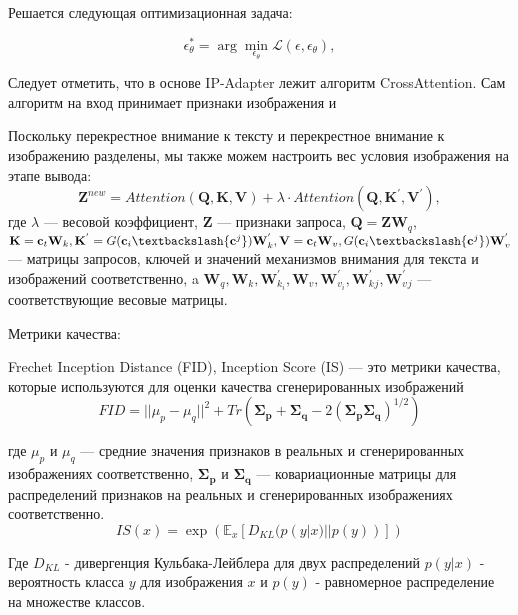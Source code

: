 \documentclass{article}
\begin{document}
Решается следующая оптимизационная задача:

\begin{equation}
\epsilon_{\theta}^* = \arg \min_{\epsilon_{\theta}}\mathcal{L}(\epsilon, \epsilon_{\theta}),
\end{equation}

Следует отметить, что в основе IP-Adapter лежит алгоритм CrossAttention. Сам алгоритм на вход принимает признаки изображения и 

Поскольку перекрестное внимание к тексту и перекрестное внимание к изображению разделены, мы также можем настроить вес условия изображения на этапе вывода:  
\begin{equation}
\mathbf{Z}^{new} = Attention(\mathbf{Q}, \mathbf{K}, \mathbf{V}) + \lambda \cdot Attention(\mathbf{Q}, \mathbf{K}^{'}, \mathbf{V}^{'}), 
\end{equation}
где $\lambda$ --- весовой коэффициент, $\mathbf{Z}$ --- признаки запроса, $\mathbf{Q} = \mathbf{Z}\mathbf{W}_q$, $\mathbf{K} = \mathbf{c}_t\mathbf{W}_k, \mathbf{K}^{'} = G(\mathbf{c}_i \textbackslash \{\mathbf{c}^j\}) {\mathbf{W}}^{'}_{k}, \mathbf{V} = \mathbf{c}_t\mathbf{W}_{v}, G(\mathbf{c}_i \textbackslash \{\mathbf{c}^j\}){\mathbf{W}}^{'}_{v}$ --- матрицы запросов, ключей и значений механизмов внимания для текста и изображений соответственно, a $\mathbf{W}_q, \mathbf{W}_k, {\mathbf{W}}^{'}_{k_i}, \mathbf{W}_v, {\mathbf{W}}^{'}_{v_i}, {\mathbf{W}}^{'}_k_j,{\mathbf{W}}^{'}_v_j$ --- соответствующие весовые матрицы. 

Метрики качества:

Frechet Inception Distance (FID), Inception Score (IS) --- это метрики качества, которые используются для оценки качества сгенерированных изображений
\begin{equation}
FID = ||\mu_p - \mu_q||^2 + Tr(\mathbf{\Sigma_p} + \mathbf{\Sigma_q} - 2(\mathbf{\Sigma_p}\mathbf{\Sigma_q})^{1/2})
\end{equation}

где \( \mu_p \) и \( \mu_q \) --- средние значения признаков в реальных и сгенерированных изображениях соответственно, \( \mathbf{\Sigma_p} \) и \( \mathbf{\Sigma_q} \) --- ковариационные матрицы для распределений признаков на реальных и сгенерированных изображениях соответственно.
\begin{equation}
IS(x) = \exp(\mathbb{E}_x \left[ D_{KL}(p(y | x) || p(y)) \right] )
\end{equation}

Где \( D_{KL} \) - дивергенция Кульбака-Лейблера для двух распределений \(p(y|x)\) - вероятность класса \(y\) для изображения \(x\) и \(p(y)\) - равномерное распределение на множестве классов.
\end{document}
